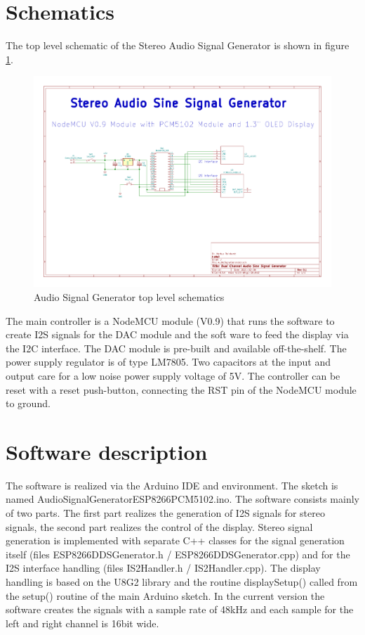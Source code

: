 \documentclass[11pt, oneside]{scrartcl}   	%
\begin{document}
\section{Schematics}
The top level schematic of the Stereo Audio Signal Generator is shown in figure \ref{fig:toplevelschematic}.
\begin{figure}[tbph]
	\centering
	\includegraphics[width=\linewidth]{AudioSignalGeneratorSchematics.pdf}
	\caption[Audio Signal Generator top level schematics]{Audio Signal Generator top level schematics}
	\label{fig:toplevelschematic}
\end{figure}
The main controller is a NodeMCU module (V0.9) that runs the software to create I2S signals for the DAC module and the soft
ware to feed the display via the I2C interface. The DAC module is pre-built and available off-the-shelf. The 
power supply regulator is of type LM7805. Two capacitors at the input and output care for a low noise power supply voltage of 5V. The controller can be reset with a reset push-button, connecting the RST pin of the NodeMCU module to ground.
\newpage

\section{Software description}
The software is realized via the Arduino IDE and environment. The sketch is named AudioSignalGeneratorESP8266PCM5102.ino.
The software consists mainly of two parts. The first part realizes the generation of I2S signals for stereo signals, the second part realizes the control of the display. Stereo signal generation is implemented with separate C++ classes for the signal generation itself (files ESP8266DDSGenerator.h / ESP8266DDSGenerator.cpp) and for the I2S interface handling (files IS2Handler.h / IS2Handler.cpp). The display handling is based on the U8G2 library and the routine displaySetup() called from the setup() routine of the main Arduino sketch.
In the current version the software creates the signals with a sample rate of 48kHz and each sample for the left and right channel is 16bit wide.
\end{document}
